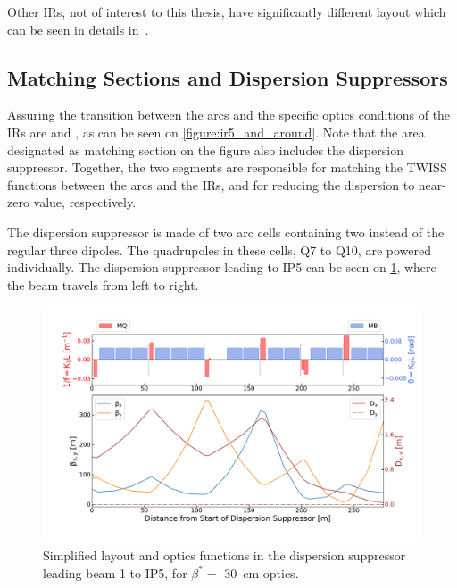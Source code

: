 Other IRs, not of interest to this thesis, have significantly different layout which can be seen in details in~\cite{BOOK:Bruning:LHC_Design_Report_Main_Ring,PHD:Vanbavinckhove}.

\subsection{Matching Sections and Dispersion Suppressors}
\label{subsection:matching_sections_dispersion_suppressors}

Assuring the transition between the arcs and the specific optics conditions of the IRs are  and , as can be seen on \cref{figure:ir5_and_around}.
Note that the area designated as matching section on the figure also includes the dispersion suppressor.
Together, the two segments are responsible for matching the TWISS functions between the arcs and the IRs, and for reducing the dispersion to near-zero value, respectively.

The dispersion suppressor is made of two arc cells containing two instead of the regular three dipoles.
The quadrupoles in these cells, Q\num{7} to Q\num{10}, are powered individually.
The dispersion suppressor leading to IP\num{5} can be seen on \cref{figure:lhc_dispersion_suppressor}, where the beam travels from left to right.

\begin{figure}[!hbt]
  \centering
  \includegraphics*[width=0.99\linewidth]{Figures/Optics_Measurements_Corrections_at_LHC/lhc_dispersion_suppressor.pdf}
  \caption{Simplified layout and optics functions in the dispersion suppressor leading beam \num{1} to IP\num{5}, for \(\beta^{\ast} =\) \qty{30}{\centi\meter} optics.}
  \label{figure:lhc_dispersion_suppressor}
\end{figure}

